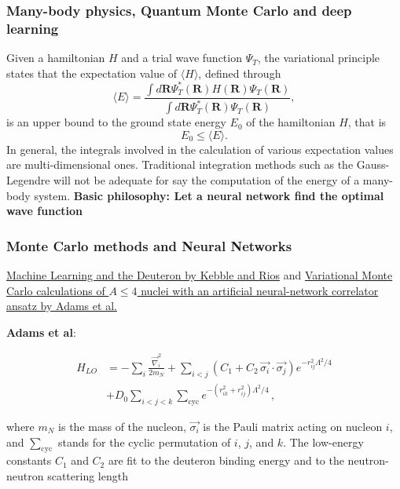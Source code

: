 \documentclass{beamer}
\begin{document}
\begin{frame}
\frametitle{Many-body physics, Quantum Monte Carlo and deep learning}

\begin{block}{}
Given a hamiltonian $H$ and a trial wave function $\Psi_T$, the variational principle states that the expectation value of $\langle H \rangle$, defined through 
\[
   \langle E \rangle =
   \frac{\int d\bm{R}\Psi^{\ast}_T(\bm{R})H(\bm{R})\Psi_T(\bm{R})}
        {\int d\bm{R}\Psi^{\ast}_T(\bm{R})\Psi_T(\bm{R})},
\]
is an upper bound to the ground state energy $E_0$ of the hamiltonian $H$, that is 
\[
    E_0 \le \langle E \rangle.
\]
In general, the integrals involved in the calculation of various  expectation values  are multi-dimensional ones. Traditional integration methods such as the Gauss-Legendre will not be adequate for say the  computation of the energy of a many-body system.  \textbf{Basic philosophy: Let a neural network find the optimal wave function}
\end{block}
\end{frame}

\begin{frame}
\frametitle{Monte Carlo methods and Neural Networks}

\href{{https://www.sciencedirect.com/science/article/pii/S0370269320305463?via%3Dihub}}{Machine Learning and the Deuteron by Kebble and Rios} and
\href{{https://journals.aps.org/prl/abstract/10.1103/PhysRevLett.127.022502}}{Variational Monte Carlo calculations of $A\le 4$ nuclei with an artificial neural-network correlator ansatz by Adams et al.}

\textbf{Adams et al}:

\begin{align}
H_{LO} &=-\sum_i \frac{{\vec{\nabla}_i^2}}{2m_N}
+\sum_{i<j} {\left(C_1  + C_2\, \vec{\sigma_i}\cdot\vec{\sigma_j}\right)
e^{-r_{ij}^2\Lambda^2 / 4 }}
\nonumber\\
&+D_0 \sum_{i<j<k} \sum_{\text{cyc}}
{e^{-\left(r_{ik}^2+r_{ij}^2\right)\Lambda^2/4}}\,,
\end{align}

where $m_N$ is the mass of the nucleon, $\vec{\sigma_i}$ is the Pauli
matrix acting on nucleon $i$, and $\sum_{\text{cyc}}$ stands for the
cyclic permutation of $i$, $j$, and $k$. The low-energy constants
$C_1$ and $C_2$ are fit to the deuteron binding energy and to the
neutron-neutron scattering length
\end{frame}
\end{document}
